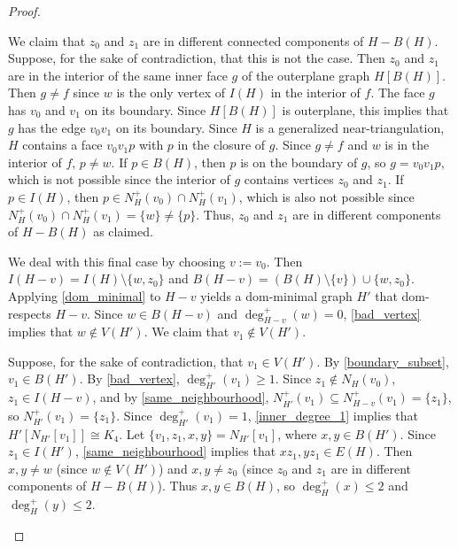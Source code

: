 \documentclass{patmorin}
\begin{document}
\begin{proof}
\begin{itemize}[leftmargin=*,label=$\bigstar$]
\begin{itemize}[leftmargin=*,label=]
\begin{itemize}[leftmargin=*,label=]
We claim that $z_{0}$ and $z_{1}$ are in different connected components of $H-B(H)$.  Suppose, for the sake of contradiction, that this is not the case.  Then $z_0$ and $z_1$ are in the interior of the same inner face $g$ of the outerplane graph $H[B(H)]$. Then $g\neq f$ since $w$ is the only vertex of $I(H)$ in the interior of $f$.  The face $g$ has $v_0$ and $v_1$ on its boundary.  Since $H[B(H)]$ is outerplane, this implies that $g$ has the edge $v_0v_1$ on its boundary.  Since $H$ is a generalized near-triangulation, $H$ contains a face $v_0v_1p$ with $p$ in the closure of $g$. Since $g\neq f$ and $w$ is in the interior of $f$, $p\neq w$.  If $p\in B(H)$, then $p$ is on the boundary of $g$, so $g=v_0v_1p$, which is not possible since the interior of $g$ contains vertices $z_0$ and $z_1$.  If $p\in I(H)$, then $p\in N^+_H(v_0)\cap N^+_H(v_1)$, which is also not possible since $N^+_H(v_0)\cap N^+_H(v_1)=\{w\}\neq\{p\}$.  Thus, $z_0$ and $z_1$ are in different components of $H-B(H)$ as claimed.

We deal with this final case by choosing $v:=v_0$. Then $I(H-v)=I(H)\setminus\{w,z_0\}$ and $B(H-v)=(B(H)\setminus\{v\})\cup\{w,z_0\}$. Applying \cref{dom_minimal} to $H-v$ yields a dom-minimal graph $H'$ that dom-respects $H-v$. Since $w\in B(H-v)$ and $\deg^+_{H-v}(w)=0$, \ref{bad_vertex} implies that $w\not\in V(H')$. We claim that $v_1\not\in V(H')$.

Suppose, for the sake of contradiction, that $v_1\in V(H')$. By \ref{boundary_subset}, $v_1\in B(H')$. By \ref{bad_vertex}, $\deg^+_{H'}(v_1)\ge 1$. Since $z_1\not\in N_H(v_0)$, $z_1\in I(H-v)$, and by \ref{same_neighbourhood}, $N^+_{H'}(v_1)\subseteq N^+_{H-v}(v_1)=\{z_1\}$, so $N^+_{H'}(v_1)=\{z_1\}$. Since $\deg^+_{H'}(v_1)=1$, \ref{inner_degree_1} implies that $H'[N_{H'}[v_1]]\cong K_4$. Let $\{v_1,z_1,x,y\}=N_{H'}[v_1]$, where $x,y\in B(H')$. Since $z_1\in I(H')$, \ref{same_neighbourhood} implies that $xz_1,yz_1\in E(H)$. Then $x,y\neq w$ (since $w\not\in V(H')$) and $x,y\neq z_0$ (since $z_0$ and $z_1$ are in different components of $H-B(H)$). Thus $x,y\in B(H)$, so $\deg^+_H(x)\le 2$ and $\deg^+_H(y)\le 2$.


\end{itemize}
\end{itemize}
\end{itemize}
\end{proof}
\end{document}
